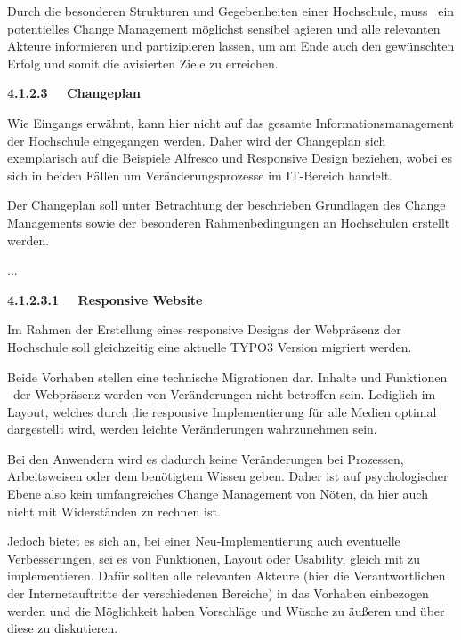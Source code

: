 \documentclass[a4paper]{article}
\begin{document}
\bigskip

{\sffamily
Durch die besonderen Strukturen und Gegebenheiten einer Hochschule, muss \ ein potentielles Change Management möglichst
sensibel agieren und alle relevanten Akteure informieren und partizipieren lassen, um am Ende auch den gewünschten
Erfolg und somit die avisierten Ziele zu erreichen.}


\bigskip

{\sffamily\bfseries
4.1.2.3 \ \ Changeplan}

{\sffamily
Wie Eingangs erwähnt, kann hier nicht auf das gesamte Informationsmanagement der Hochschule eingegangen werden. Daher
wird der Changeplan sich exemplarisch auf die Beispiele Alfresco und Responsive Design beziehen, wobei es sich in
beiden Fällen um Veränderungsprozesse im IT-Bereich handelt.}


\bigskip

{\sffamily
Der Changeplan soll unter Betrachtung der beschrieben Grundlagen des Change Managements sowie der besonderen
Rahmenbedingungen an Hochschulen erstellt werden. }


\bigskip

{\sffamily
...}


\bigskip

{\sffamily\bfseries
4.1.2.3.1 \ \ Responsive Website}

{\sffamily
Im Rahmen der Erstellung eines responsive Designs der Webpräsenz der Hochschule soll gleichzeitig eine aktuelle TYPO3
Version migriert werden. }


\bigskip

{\sffamily
Beide Vorhaben stellen eine technische Migrationen dar. Inhalte und Funktionen \ der Webpräsenz werden von Veränderungen
nicht betroffen sein. Lediglich im Layout, welches durch die responsive Implementierung für alle Medien optimal
dargestellt wird, werden leichte Veränderungen wahrzunehmen sein. }


\bigskip

{\sffamily
Bei den Anwendern wird es dadurch keine Veränderungen bei Prozessen, Arbeitsweisen oder dem benötigtem Wissen geben.
Daher ist auf psychologischer Ebene also kein umfangreiches Change Management von Nöten, da hier auch nicht mit
Widerständen zu rechnen ist. }


\bigskip

{\sffamily
Jedoch bietet es sich an, bei einer Neu-Implementierung auch eventuelle Verbesserungen, sei es von Funktionen, Layout
oder Usability, gleich mit zu implementieren. Dafür sollten alle relevanten Akteure (hier die Verantwortlichen der
Internetauftritte der verschiedenen Bereiche) in das Vorhaben einbezogen werden und die Möglichkeit haben Vorschläge
und Wüsche zu äußeren und über diese zu diskutieren. }
\end{document}
